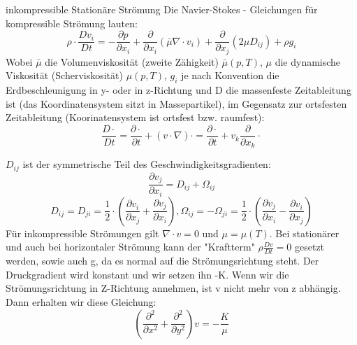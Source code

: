 \documentclass[
	11pt, %
]{beamer}
\begin{document}
\begin{frame}
	\begin{exampleblock}{inkompressible Station\"are Str\"omung}
		Die Navier-Stokes - Gleichungen f\"ur kompressible Str\"omung lauten:	
			\begin{equation}
				\rho\cdot \frac{Dv_i}{Dt} = -\frac{\partial p}{\partial x_i} + \frac{\partial}{\partial x_i}\left(\bar{\mu} \nabla \cdot v_i \right) + \frac{\partial}{\partial x_j}\left(2\mu D_{ij}\right)+\rho g_i
			\end{equation}
			Wobei $\bar{\mu}$ die Volumenviskosit\"at (zweite Z\"ahigkeit) $\bar{\mu}(p,T)$, $\mu$ die dynamische Viskosit\"at (Scherviskosit\"at) $\mu(p,T)$, $g_i$ je nach Konvention die Erdbeschleunigung in y- oder in z-Richtung und D die massenfeste Zeitableitung ist (das Koordinatensystem sitzt in Massepartikel), im Gegensatz zur ortsfesten Zeitableitung (Koorinatensystem ist ortsfest bzw. raumfest):
			\begin{equation}
				\frac{D\cdot}{Dt}=\frac{\partial\cdot}{\partial t} + \left(v \cdot \nabla\right)\cdot = \frac{\partial\cdot}{\partial t} + v_k \frac{\partial}{\partial x_k}\cdot
			\end{equation}
	\end{exampleblock}
			\end{frame}
			\begin{frame}
				\begin{exampleblock}{}
			$D_{ij}$ ist der symmetrische Teil des Geschwindigkeitsgradienten:
			\begin{equation}
				\frac{\partial v_j}{\partial x_i}=D_{ij}+\Omega_{ij}
			\end{equation}
			\begin{equation}
				D_{ij}=D_{ji}=\frac{1}{2}\cdot \left(\frac{\partial v_i}{\partial x_j}+\frac{\partial v_j}{\partial x_i}\right), \Omega_{ij}=-\Omega_{ji}=\frac{1}{2}\cdot \left(\frac{\partial v_j}{\partial x_i}-\frac{\partial v_i}{\partial x_j}\right)
			\end{equation}
					F\"ur inkompressible Str\"omungen gilt $\nabla \cdot v=0$ und $\mu=\mu(T)$. Bei station\"arer und auch bei horizontaler Str\"omung  kann der "Kraftterm" $\rho \frac{Dv}{Dt}=0$ gesetzt werden, sowie auch g, da es normal auf die Str\"omungsrichtung steht. Der Druckgradient wird konstant und wir setzen ihn -K. Wenn wir die Str\"omungsrichtung in Z-Richtung annehmen, ist v nicht mehr von z abh\"angig. Dann erhalten wir diese Gleichung:
			\begin{equation}
				\left(\frac{\partial^2}{\partial x^2}+\frac{\partial^2}{\partial y^2}\right)v = -\frac{K}{\mu}
			\end{equation}
	\end{exampleblock}
\end{frame}
\end{document}
